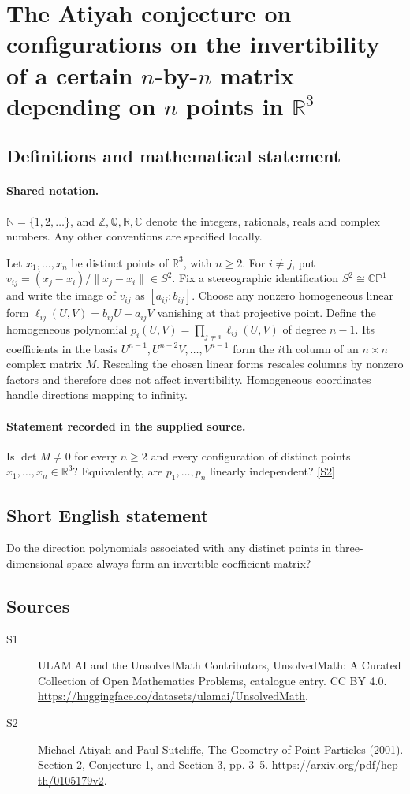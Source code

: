 \documentclass[11pt]{article}
\newcommand{\sref}[2]{\hyperlink{source:#1:#2}{[S#2]}}
\begin{document}
\section{The Atiyah conjecture on configurations on the invertibility of a certain $n$-by-$n$ matrix depending on $n$ points in $\mathbb{R}^{3}$}\label{statement}

\subsection{Definitions and mathematical statement}

\paragraph{Shared notation.}$\mathbb N=\{1,2,\ldots\}$, and $\mathbb Z,\mathbb Q,\mathbb R,\mathbb C$ denote the integers, rationals, reals and complex numbers. Any other conventions are specified locally.


Let $x_1,\ldots,x_n$ be distinct points of $\mathbb R^3$, with $n\geq2$. For $i\ne j$, put $v_{ij}=(x_j-x_i)/\|x_j-x_i\|\in S^2$. Fix a stereographic identification $S^2\cong\mathbb{CP}^1$ and write the image of $v_{ij}$ as $[a_{ij}:b_{ij}]$. Choose any nonzero homogeneous linear form $\ell_{ij}(U,V)=b_{ij}U-a_{ij}V$ vanishing at that projective point. Define the homogeneous polynomial $p_i(U,V)=\prod_{j\ne i}\ell_{ij}(U,V)$ of degree $n-1$. Its coefficients in the basis $U^{n-1},U^{n-2}V,\ldots,V^{n-1}$ form the $i$th column of an $n\times n$ complex matrix $M$. Rescaling the chosen linear forms rescales columns by nonzero factors and therefore does not affect invertibility. Homogeneous coordinates handle directions mapping to infinity.
\paragraph{Statement recorded in the supplied source.}
Is $\det M\ne0$ for every $n\geq2$ and every configuration of distinct points $x_1,\ldots,x_n\in\mathbb R^3$? Equivalently, are $p_1,\ldots,p_n$ linearly independent? \sref{statement}{2}
\subsection{Short English statement}
Do the direction polynomials associated with any distinct points in three-dimensional space always form an invertible coefficient matrix?
\subsection{Sources}
\begin{description}
\item[\hypertarget{source:statement:1}{S1}] ULAM.AI and the UnsolvedMath Contributors, UnsolvedMath: A Curated Collection of Open Mathematics Problems, catalogue entry. CC BY 4.0. \url{https://huggingface.co/datasets/ulamai/UnsolvedMath}.
\item[\hypertarget{source:statement:2}{S2}] Michael Atiyah and Paul Sutcliffe, The Geometry of Point Particles (2001). Section 2, Conjecture 1, and Section 3, pp. 3–5. \url{https://arxiv.org/pdf/hep-th/0105179v2}.
\end{description}
\label{end:statement}
\end{document}
